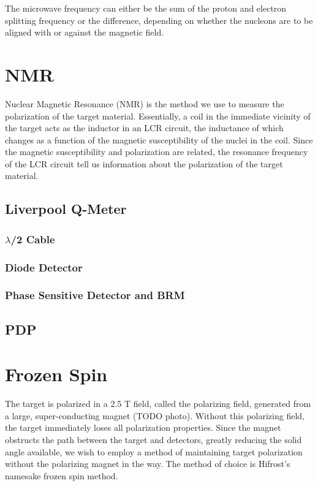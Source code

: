 The microwave frequency can either be the sum of the proton and electron splitting frequency or the difference, depending on whether the nucleons are to be aligned with or against the magnetic field. 
\section{NMR}

Nuclear Magnetic Resonance (NMR) is the method we use to measure the polarization of the target material.  Essentially, a coil in the immediate vicinity of the target acts as the inductor in an LCR circuit, the inductance of which changes as a function of the magnetic susceptibility of the nuclei in the coil.  Since the magnetic susceptibility and polarization are related, the resonance frequency of the LCR circuit tell us information about the polarization of the target material\cite{qmeterbook}. 

\subsection{Liverpool Q-Meter}

\subsubsection{$\lambda$/2 Cable}

\subsubsection{Diode Detector}

\subsubsection{Phase Sensitive Detector and BRM}

\subsection{PDP}

\section{Frozen Spin} 
 
 The target is polarized in a 2.5 T field, called the polarizing field, generated from a large, super-conducting magnet (TODO photo).  Without this polarizing field, the target immediately loses all polarization properties.  Since the magnet obstructs the path between the target and detectors, greatly reducing the solid angle available, we wish to employ a method of maintaining target polarization without the polarizing magnet in the way.  The method of choice is Hifrost's namesake frozen spin method.
 
